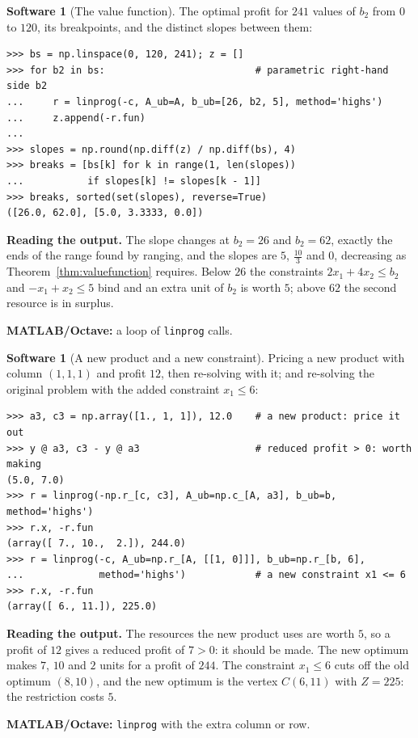\documentclass[11pt,a4paper]{article}
\numberwithin{equation}{section}
\theoremstyle{definition}
\newtheorem{software}[thm]{Software}
\begin{document}
\begin{software}[The value function]
\label{sw:valuefunction}
The optimal profit for $241$ values of $b_2$ from $0$ to $120$, its breakpoints, and the distinct slopes between them:
{\small\begin{verbatim}
>>> bs = np.linspace(0, 120, 241); z = []
>>> for b2 in bs:                          # parametric right-hand side b2
...     r = linprog(-c, A_ub=A, b_ub=[26, b2, 5], method='highs')
...     z.append(-r.fun)
...
>>> slopes = np.round(np.diff(z) / np.diff(bs), 4)
>>> breaks = [bs[k] for k in range(1, len(slopes))
...           if slopes[k] != slopes[k - 1]]
>>> breaks, sorted(set(slopes), reverse=True)
([26.0, 62.0], [5.0, 3.3333, 0.0])
\end{verbatim}}
\textbf{Reading the output.} The slope changes at $b_2 = 26$ and $b_2 = 62$, exactly the ends of the range found by ranging, and the slopes are $5$, $\frac{10}3$ and $0$, decreasing as Theorem~\ref{thm:valuefunction} requires. Below $26$ the constraints $2x_1 + 4x_2 \leq b_2$ and $-x_1 + x_2 \leq 5$ bind and an extra unit of
$b_2$ is worth $5$; above $62$ the second resource is in surplus.

\textbf{MATLAB/Octave:} a loop of \texttt{linprog} calls.
\end{software}

\begin{software}[A new product and a new constraint]
\label{sw:newvar}
Pricing a new product with column $(1, 1, 1)$ and profit $12$, then re-solving with it; and re-solving the original problem with the added constraint $x_1 \leq 6$:
{\small\begin{verbatim}
>>> a3, c3 = np.array([1., 1, 1]), 12.0    # a new product: price it out
>>> y @ a3, c3 - y @ a3                    # reduced profit > 0: worth making
(5.0, 7.0)
>>> r = linprog(-np.r_[c, c3], A_ub=np.c_[A, a3], b_ub=b, method='highs')
>>> r.x, -r.fun
(array([ 7., 10.,  2.]), 244.0)
>>> r = linprog(-c, A_ub=np.r_[A, [[1, 0]]], b_ub=np.r_[b, 6],
...             method='highs')            # a new constraint x1 <= 6
>>> r.x, -r.fun
(array([ 6., 11.]), 225.0)
\end{verbatim}}
\textbf{Reading the output.} The resources the new product uses are worth $5$, so a profit of $12$ gives a reduced profit of $7 > 0$: it should be made. The new optimum makes $7$, $10$ and $2$ units for a profit of $244$. The constraint $x_1 \leq 6$ cuts off the old optimum $(8, 10)$, and the new optimum is the vertex
$C(6, 11)$ with $Z = 225$: the restriction costs $5$.

\textbf{MATLAB/Octave:} \texttt{linprog} with the extra column or row.
\end{software}
\end{document}
